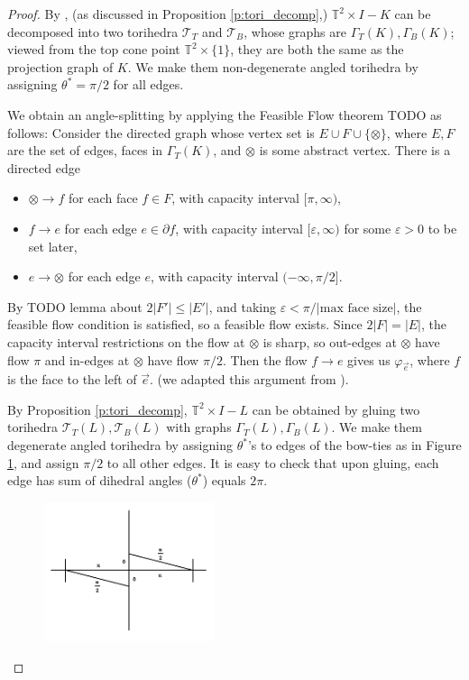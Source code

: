 \documentclass[11pt]{amsart}
\newcommand{\prpref}[1]{Proposition \ref{#1}}
\newcommand{\figref}[1]{Figure \ref{#1}}
\newcommand{\torus}{{\mathbb{T}^2}}
\newcommand{\sT}{{\mathcal{T}}}
\newcommand{\del}{\partial}
\newcommand{\vphi}{\varphi}
\newcommand{\veps}{\varepsilon}
\newcommand{\toruscomp}[1]{{\torus \times I - #1}}
\theoremstyle{plain}
\theoremstyle{definition}
\begin{document}
\begin{proof}
By \cite[Theorem 7.5]{CKP2},
(as discussed in \prpref{p:tori_decomp},)
$\toruscomp{K}$ can be decomposed
into two torihedra $\sT_T$ and $\sT_B$,
whose graphs are $\Gamma_T(K), \Gamma_B(K)$;
viewed from the top cone point $\torus \times \{1\}$,
they are both the same as the projection graph of $K$.
We make them non-degenerate angled torihedra by assigning $\theta^* = \pi/2$
for all edges.

We obtain an angle-splitting by applying the
Feasible Flow theorem TODO as follows:
Consider the directed graph whose vertex set is
$E \cup F \cup \{\otimes\}$,
where $E, F$ are the set of edges, faces in $\Gamma_T(K)$,
and $\otimes$ is some abstract vertex.
There is a directed edge
\begin{itemize}
\item $\otimes \to f$ for each face $f\in F$, with capacity interval
	$[\pi, \infty)$,
\item $f \to e$ for each edge $e \in \del f$,
	with capacity interval $[\veps, \infty)$
	for some $\veps>0$ to be set later,
\item $e \to \otimes$ for each edge $e$, with capacity interval
	$(-\infty, \pi/2]$.
\end{itemize}
By TODO lemma about $2|F'| \leq |E'|$,
and taking $\veps < \pi / |\text{max face size}|$,
the feasible flow condition is satisfied,
so a feasible flow exists.
Since $2|F| = |E|$, the capacity interval restrictions
on the flow at $\otimes$ is sharp, so out-edges at $\otimes$
have flow $\pi$ and in-edges at $\otimes$ have flow $\pi/2$.
Then the flow $f \to e$ gives us $\vphi_{\vec{e}}$,
where $f$ is the face to the left of $\vec{e}$.
(we adapted this argument from \cite{BandS}).


By \prpref{p:tori_decomp}, $\toruscomp{L}$ can be
obtained by gluing two torihedra $\sT_T(L),\sT_B(L)$
with graphs $\Gamma_T(L),\Gamma_B(L)$.
We make them degenerate angled torihedra by assigning $\theta^*$'s
to edges of the bow-ties as in \figref{f:bowtie_angles},
and assign $\pi/2$ to all other edges.
It is easy to check that upon gluing,
each edge has sum of dihedral angles ($\theta^*$) equals $2\pi$.


\begin{figure}
\label{f:bowtie_angles}
\includegraphics[width=5cm]{more_pictures/horizontal_bowtie.png}
\end{figure}



\end{proof}
\end{document}
